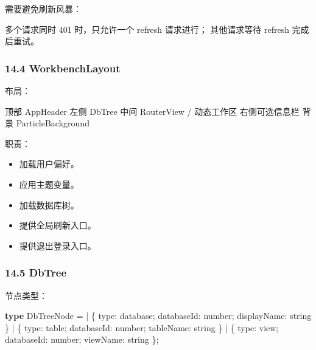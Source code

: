 \documentclass[
  a4paper,
  UTF8]{ctexart}
\newenvironment{Shaded}{}{}
\newcommand{\DataTypeTok}[1]{\textcolor[rgb]{0.56,0.13,0.00}{#1}}
\newcommand{\KeywordTok}[1]{\textcolor[rgb]{0.00,0.44,0.13}{\textbf{#1}}}
\newcommand{\NormalTok}[1]{#1}
\newcommand{\OperatorTok}[1]{\textcolor[rgb]{0.40,0.40,0.40}{#1}}
\newcommand{\StringTok}[1]{\textcolor[rgb]{0.25,0.44,0.63}{#1}}
\providecommand{\tightlist}{%
  \setlength{\itemsep}{0pt}\setlength{\parskip}{0pt}}
\begin{document}
需要避免刷新风暴：

\begin{Shaded}
\begin{Highlighting}[]
\NormalTok{多个请求同时 401 时，只允许一个 refresh 请求进行；}
\NormalTok{其他请求等待 refresh 完成后重试。}
\end{Highlighting}
\end{Shaded}

\hypertarget{workbenchlayout}{%
\subsubsection{14.4 WorkbenchLayout}\label{workbenchlayout}}

布局：

\begin{Shaded}
\begin{Highlighting}[]
\NormalTok{顶部 AppHeader}
\NormalTok{左侧 DbTree}
\NormalTok{中间 RouterView / 动态工作区}
\NormalTok{右侧可选信息栏}
\NormalTok{背景 ParticleBackground}
\end{Highlighting}
\end{Shaded}

职责：

\begin{itemize}
\tightlist
\item
  加载用户偏好。
\item
  应用主题变量。
\item
  加载数据库树。
\item
  提供全局刷新入口。
\item
  提供退出登录入口。
\end{itemize}

\hypertarget{dbtree}{%
\subsubsection{14.5 DbTree}\label{dbtree}}

节点类型：

\begin{Shaded}
\begin{Highlighting}[]
\KeywordTok{type}\NormalTok{ DbTreeNode }\OperatorTok{=}
  \OperatorTok{|}\NormalTok{ \{ type}\OperatorTok{:} \StringTok{\textquotesingle{}database\textquotesingle{}}\OperatorTok{;}\NormalTok{ databaseId}\OperatorTok{:} \DataTypeTok{number}\OperatorTok{;}\NormalTok{ displayName}\OperatorTok{:} \DataTypeTok{string}\NormalTok{ \}}
  \OperatorTok{|}\NormalTok{ \{ type}\OperatorTok{:} \StringTok{\textquotesingle{}table\textquotesingle{}}\OperatorTok{;}\NormalTok{ databaseId}\OperatorTok{:} \DataTypeTok{number}\OperatorTok{;}\NormalTok{ tableName}\OperatorTok{:} \DataTypeTok{string}\NormalTok{ \}}
  \OperatorTok{|}\NormalTok{ \{ type}\OperatorTok{:} \StringTok{\textquotesingle{}view\textquotesingle{}}\OperatorTok{;}\NormalTok{ databaseId}\OperatorTok{:} \DataTypeTok{number}\OperatorTok{;}\NormalTok{ viewName}\OperatorTok{:} \DataTypeTok{string}\NormalTok{ \}}\OperatorTok{;}
\end{Highlighting}
\end{Shaded}
\end{document}
